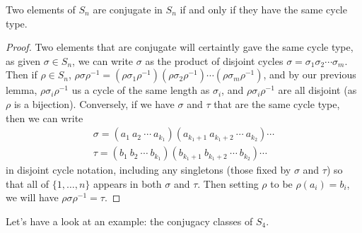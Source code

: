 \documentclass[a4paper]{scrartcl}
\begin{document}
\begin{proposition}
	Two elements of $S_n$ are conjugate in $S_n$ if and only if they have the same cycle type.
\end{proposition}
\begin{proof}
	Two elements that are conjugate will certaintly gave the same cycle type, as given
	$\sigma \in S_n$, we can write $\sigma$ as the product of disjoint cycles $\sigma = \sigma_1 \sigma_2 \cdots \sigma_m$. Then if $\rho \in S_n$, $\rho \sigma \rho^{-1} = (\rho \sigma_1 \rho^{-1}) (\rho \sigma_2 \rho^{-1}) \cdots  (\rho \sigma_m \rho^{-1})$, and by our previous lemma, $\rho \sigma_i \rho^{-1}$ us a cycle of the same length as $\sigma_i$, and $\rho \sigma_i \rho^{-1}$ are all disjoint (as $\rho$ is a bijection).
	Conversely, if we have $\sigma$ and $\tau$ that are the same cycle type, then we can write
	\begin{align*}
		\sigma = (a_1\ a_2\ \cdots\ a_{k_1})(a_{k_1 + 1}\ a_{k_1 + 2}\ \cdots\ a_{k_2}) \cdots \\
		\tau = (b_1\ b_2\ \cdots\ b_{k_1})(b_{k_1 + 1}\ b_{k_1 + 2}\ \cdots\ b_{k_2}) \cdots
	\end{align*}
	in disjoint cycle notation, including any singletons (those fixed by $\sigma$ and $\tau$) so that all of $\{1, \dots, n\}$ appears in both $\sigma$ and $\tau$. Then setting $\rho$
 to be $\rho(a_i) = b_i$, we will have $\rho \sigma \rho^{-1} = \tau$.
\end{proof}

Let's have a look at an example: the conjugacy classes of $S_4$.
\end{document}
